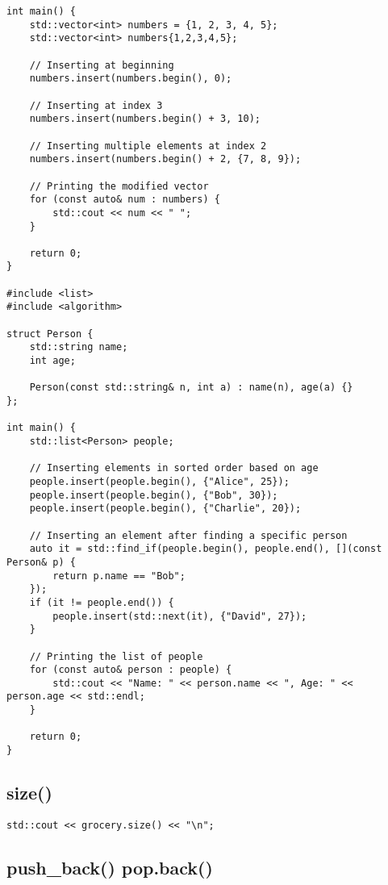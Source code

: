 \documentclass[openany]{report}
\begin{document}
\begin{verbatim}
int main() {
    std::vector<int> numbers = {1, 2, 3, 4, 5};
    std::vector<int> numbers{1,2,3,4,5};

    // Inserting at beginning
    numbers.insert(numbers.begin(), 0); 

    // Inserting at index 3
    numbers.insert(numbers.begin() + 3, 10);

    // Inserting multiple elements at index 2
    numbers.insert(numbers.begin() + 2, {7, 8, 9});

    // Printing the modified vector
    for (const auto& num : numbers) {
        std::cout << num << " ";
    }

    return 0;
}

#include <list>
#include <algorithm>

struct Person {
    std::string name;
    int age;

    Person(const std::string& n, int a) : name(n), age(a) {}
};

int main() {
    std::list<Person> people;

    // Inserting elements in sorted order based on age
    people.insert(people.begin(), {"Alice", 25});
    people.insert(people.begin(), {"Bob", 30});
    people.insert(people.begin(), {"Charlie", 20});

    // Inserting an element after finding a specific person
    auto it = std::find_if(people.begin(), people.end(), [](const Person& p) {
        return p.name == "Bob";
    });
    if (it != people.end()) {
        people.insert(std::next(it), {"David", 27});
    }

    // Printing the list of people
    for (const auto& person : people) {
        std::cout << "Name: " << person.name << ", Age: " << person.age << std::endl;
    }

    return 0;
}
\end{verbatim}

\subsection{size()}

\begin{verbatim}
std::cout << grocery.size() << "\n";
\end{verbatim}

\subsection{push\_back() pop.back()}
\end{document}
